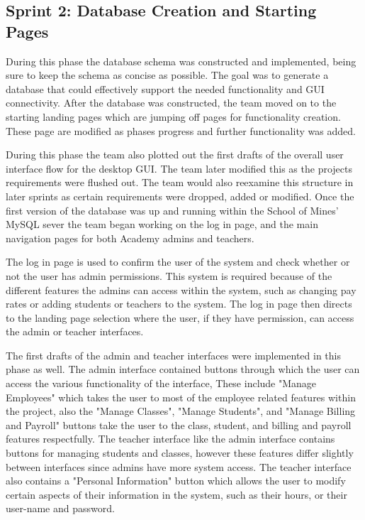 \subsection{Sprint 2: Database Creation and Starting Pages}
During this phase the database schema was constructed and implemented, being sure to keep the schema as concise as possible. The goal was to generate a database that could effectively support the needed functionality and GUI connectivity. After the database was constructed, the team moved on to the starting landing pages which are jumping off pages for functionality creation. These page are modified as phases progress and further functionality was added.

During this phase the team also plotted out the first drafts of the overall user interface flow for the desktop GUI. The team later modified this as the projects requirements were flushed out. The team would also reexamine this structure in later sprints as certain requirements were dropped, added or modified. Once the first version of the database was up and running within the School of Mines' MySQL sever the team began working on the log in page, and the main navigation pages for both Academy admins and teachers.

The log in page is used to confirm the user of the system and check whether or not the user has admin permissions. This system is required because of the different features the admins can access within the system, such as changing pay rates or adding students or teachers to the system. The log in page then directs to the landing page selection where the user, if they have permission, can access the admin or teacher interfaces.

The first drafts of the admin and teacher interfaces were implemented in this phase as well. The admin interface contained buttons through which the user can access the various functionality of the interface, These include "Manage Employees" which takes the user to most of the employee related features within the project, also the "Manage Classes", "Manage Students", and "Manage Billing and Payroll" buttons take the user to the class, student, and billing and payroll features respectfully. The teacher interface like the admin interface contains buttons for managing students and classes, however these features differ slightly between interfaces since admins have more system access. The teacher interface also contains a "Personal Information" button which allows the user to modify certain aspects of their information in the system, such as their hours, or their user-name and password. 

